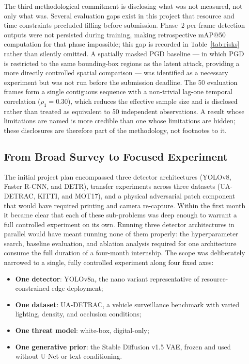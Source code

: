 \documentclass[12pt,a4paper]{report}
\begin{document}
The third methodological commitment is disclosing what was not
measured, not only what was. Several evaluation gaps exist in
this project that resource and time constraints precluded
filling before submission. Phase~2 per-frame detection outputs
were not persisted during training, making retrospective
mAP@50 computation for that phase impossible; this gap is
recorded in Table~\ref{tab:risks} rather than silently omitted.
A spatially masked PGD baseline --- in which PGD is restricted
to the same bounding-box regions as the latent attack, providing
a more directly controlled spatial comparison --- was identified
as a necessary experiment but was not run before the submission
deadline. The 50 evaluation frames form a single contiguous
sequence with a non-trivial lag-one temporal correlation
($\rho_1 = 0.30$), which reduces the effective sample size and
is disclosed rather than treated as equivalent to 50 independent
observations. A result whose limitations are named is more
credible than one whose limitations are hidden; these
disclosures are therefore part of the methodology, not
footnotes to it.

\subsection{From Broad Survey to Focused Experiment}
\label{subsec:scope}

The initial project plan encompassed three detector architectures
(YOLOv8, Faster R-CNN, and DETR), transfer experiments across
three datasets (UA-DETRAC, KITTI, and MOT17), and a physical
adversarial patch component that would have required printing and
camera re-capture. Within the first month it became clear that
each of these sub-problems was deep enough to warrant a full
controlled experiment on its own. Running three detector
architectures in parallel would have meant running none of them
properly: the hyperparameter search, baseline evaluation, and
ablation analysis required for one architecture consume the full
duration of a four-month internship. The scope was deliberately
narrowed to a single, fully controlled experiment along four
fixed axes:

\begin{itemize}[itemsep=3pt]
  \item \textbf{One detector}: YOLOv8n, the nano variant
    representative of resource-constrained edge deployment;
  \item \textbf{One dataset}: UA-DETRAC, a vehicle surveillance
    benchmark with varied lighting, density, and occlusion
    conditions;
  \item \textbf{One threat model}: white-box, digital-only;
  \item \textbf{One generative prior}: the Stable Diffusion
    v1.5 VAE, frozen and used without U-Net or text
    conditioning.
\end{itemize}
\end{document}
